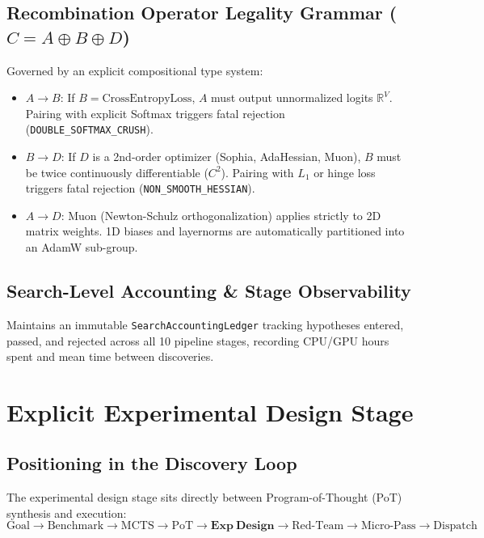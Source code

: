 \documentclass[11pt,a4paper]{article}
\begin{document}
\subsection{Recombination Operator Legality Grammar ($C = A \oplus B \oplus D$)}
Governed by an explicit compositional type system:
\begin{itemize}[noitemsep]
    \item $A \to B$: If $B = \text{CrossEntropyLoss}$, $A$ must output unnormalized logits $\mathbb{R}^V$. Pairing with explicit Softmax triggers fatal rejection (\texttt{DOUBLE\_SOFTMAX\_CRUSH}).
    \item $B \to D$: If $D$ is a 2nd-order optimizer (Sophia, AdaHessian, Muon), $B$ must be twice continuously differentiable ($C^2$). Pairing with $L_1$ or hinge loss triggers fatal rejection (\texttt{NON\_SMOOTH\_HESSIAN}).
    \item $A \to D$: Muon (Newton-Schulz orthogonalization) applies strictly to 2D matrix weights. 1D biases and layernorms are automatically partitioned into an AdamW sub-group.
\end{itemize}

\subsection{Search-Level Accounting \& Stage Observability}
Maintains an immutable \texttt{SearchAccountingLedger} tracking hypotheses entered, passed, and rejected across all 10 pipeline stages, recording CPU/GPU hours spent and mean time between discoveries.

\section{Explicit Experimental Design Stage}

\subsection{Positioning in the Discovery Loop}
The experimental design stage sits directly between Program-of-Thought (PoT) synthesis and execution:
\begin{equation*}
    \text{Goal} \longrightarrow \text{Benchmark} \longrightarrow \text{MCTS} \longrightarrow \text{PoT} \longrightarrow \mathbf{Exp\ Design} \longrightarrow \text{Red-Team} \longrightarrow \text{Micro-Pass} \longrightarrow \text{Dispatch}
\end{equation*}
\end{document}
